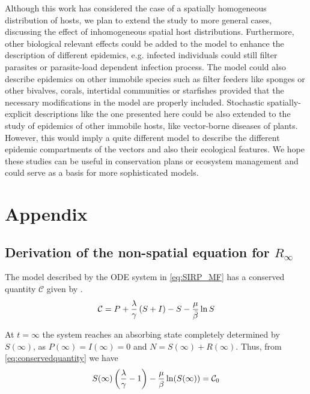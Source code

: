 Although this work has considered the case of a spatially homogeneous
distribution of hosts, we plan to extend the study to more general cases,
discussing the effect of inhomogeneous spatial host distributions. Furthermore,
other biological relevant effects could be added to the model to enhance the
description of different epidemics, e.g. infected individuals could still
filter parasites or parasite-load dependent infection process. The model could
also describe epidemics on other immobile species such as filter feeders like
sponges or other bivalves, corals, intertidal communities or starfishes
provided that the necessary modifications in the model are properly included.
Stochastic spatially-explicit descriptions like the one presented here could be
also extended to the study of epidemics of other immobile hosts, like
vector-borne diseases of plants. However, this would imply a quite different
model to describe the different epidemic compartments of the vectors and also
their ecological features. We hope these studies can be useful in conservation
plans or ecosystem management and could serve as a basis for more sophisticated
models.

\section{Appendix}

\subsection{Derivation of the non-spatial equation for $R_{\infty}$}
\label{app:Rinf}

The model described by the ODE system in \cref{eq:SIRP_MF} has a conserved
quantity $\mathcal{C}$ given by \cite{GimenezRomero2021}.
\begin{equation}\label{eq:conservedquantity}
    \mathcal{C}=P +
    \frac{\lambda}{\gamma}\left(S+I\right)-S-\frac{\mu}{\bar{\beta}}\ln S
\end{equation}

At $t=\infty$ the system reaches an absorbing state completely determined
by $S(\infty)$, as $P(\infty)=I(\infty)=0$ and $N=S(\infty)+R(\infty)$. Thus,
from \cref{eq:conservedquantity} we have
\begin{equation}\label{eq:transcendental}
    S(\infty)\left(\frac{\lambda}{\gamma}-1\right)-
    \frac{\mu}{\beta}\ln(S(\infty))=\mathcal{C}_0
\end{equation}

